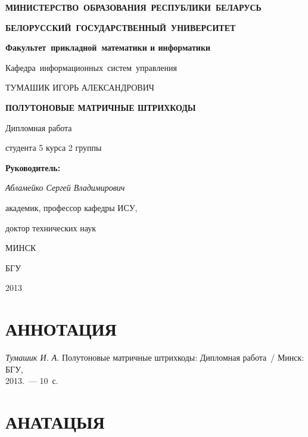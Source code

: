\titlepage
\begin{center}
	\begin{large}
		\textbf{МИНИСТЕРСТВО~ОБРАЗОВАНИЯ~РЕСПУБЛИКИ~БЕЛАРУСЬ}
		
		\smallskip
		\textbf{БЕЛОРУССКИЙ~ГОСУДАРСТВЕННЫЙ~УНИВЕРСИТЕТ}
		
		\smallskip
		\textbf{Факультет~прикладной~математики и информатики}
		
		\smallskip
		Кафедра~информационных~систем~управления
	\end{large}
\end{center}

\vfill

\begin{center}
	\large {ТУМАШИК ИГОРЬ АЛЕКСАНДРОВИЧ}
	
	\bigskip	
	{\Large \textbf{ПОЛУТОНОВЫЕ МАТРИЧНЫЕ ШТРИХКОДЫ}}
	
	\bigskip
	Дипломная работа
	
	студента 5 курса 2 группы
\end{center}


\vfill
\begin{flushright}
	\begin{minipage}{7cm}
		\textbf{Руководитель:}
		
		\textit{Абламейко Сергей Владимирович}
		
		академик, профессор кафедры ИСУ,
		
		доктор технических наук 
	\end{minipage}
\end{flushright}

\vfill

\begin{center}
	МИНСК
	
	БГУ
	
	2013
\end{center}

\newpage

\newcommand{\pagescount}{10}
\section*{АННОТАЦИЯ}

\textit{Тумашик И. А}. Полутоновые матричные штрихкоды:
Дипломная работа~/ Минск: БГУ, \\ 2013.~--- \pagescount~с.

\medskip


\section*{АНАТАЦЫЯ}


